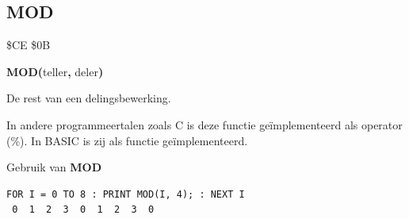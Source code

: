 
\newpage
\subsection{MOD}
\begin{description}[leftmargin=2cm,style=nextline]
\item [Token:]    \$CE \$0B

\item [Formaat:]   {\bf MOD(}teller{\bf,} deler{\bf)}

\item [Retourneert:]  De rest van een delingsbewerking.

\item [Opmerkingen:]  In andere programmeertalen zoals C is deze functie geïmplementeerd als operator (\%). In BASIC is zij als functie geïmplementeerd.

\item [Voorbeeld:]  Gebruik van {\bf MOD}

\begin{tcolorbox}[colback=black,coltext=white]
\verbatimfont{\codefont}
\begin{verbatim}
FOR I = 0 TO 8 : PRINT MOD(I, 4); : NEXT I
 0  1  2  3  0  1  2  3  0
\end{verbatim}
\end{tcolorbox}
\end{description}


\newpage
